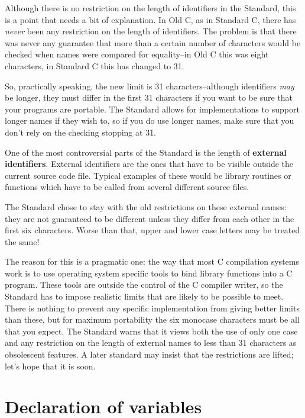    Although there is no restriction on the length of identifiers in the
    Standard, this is a point that needs a bit of explanation. In Old C,
    as in Standard C, there has \textit{never} been any restriction on
    the length of identifiers. The problem is that there was never any
    guarantee that more than a certain number of characters would be checked
    when names were compared for equality--in Old C this was eight
    characters, in Standard C this has changed to 31.


   So, practically speaking, the new limit is
    31 characters--although identifiers \textit{may} be longer, they
    must differ in the first 31 characters if you want to be sure that
    your programs are portable. The Standard allows for implementations to
    support longer names if they wish to, so if you do use longer names, make
    sure that you don't rely on the checking stopping at 31.


   One of the most controversial parts of the Standard is the length of
    \textbf{external identifiers}. External identifiers are the ones that
    have to be visible outside the current source code file. Typical examples
    of these would be library routines or functions which have to be called
    from several different source files.


   The Standard chose to stay with the old restrictions on these external
    names: they are not guaranteed to be different unless they differ from
    each other in the first six characters. Worse than that, upper and lower
    case letters may be treated the same!


   The reason for this is a pragmatic one: the way that most
    C compilation systems work is to use operating system specific tools
    to bind library functions into a C program. These tools are outside
    the control of the C compiler writer, so the Standard has to impose
    realistic limits that are likely to be possible to meet. There is nothing
    to prevent any specific implementation from giving better limits than
    these, but for maximum portability the six monocase characters must be
    all that you expect. The Standard warns that it views both the use of
    only one case and any restriction on the length of external names to less
    than 31 characters as obsolescent features. A later standard may
    insist that the restrictions are lifted; let's hope that it is soon.


  

 
        \section{Declaration of variables}
        

